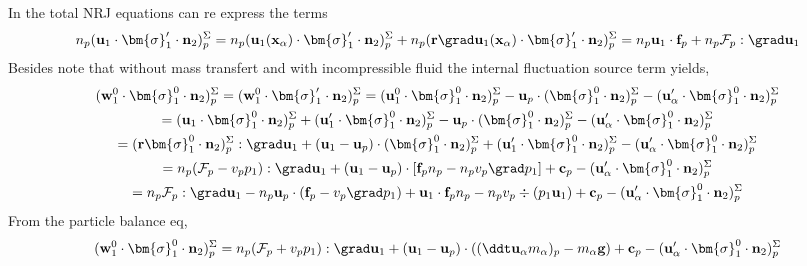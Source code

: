 In the total NRJ equations can re express the terms 
\begin{multline*}
    n_p (\textbf{u}_1 \cdot \bm{\sigma}_1' \cdot  \textbf{n}_2)^\Sigma_p
    = 
    n_p (\textbf{u}_1(\textbf{x}_\alpha) \cdot \bm{\sigma}_1' \cdot  \textbf{n}_2)^\Sigma_p
    + n_p (\textbf{r}\grad\textbf{u}_1(\textbf{x}_\alpha) \cdot \bm{\sigma}_1' \cdot  \textbf{n}_2)^\Sigma_p
    =n_p \textbf{u}_1 \cdot \textbf{f}_p
    + n_p \mathcal{F}_p :\grad \textbf{u}_1
\end{multline*}
Besides note that without mass transfert and with incompressible fluid the internal fluctuation source term yields,
\begin{multline*}
    (\textbf{w}_1^0 \cdot \bm{\sigma}_1^0 \cdot  \textbf{n}_2)^\Sigma_p
    =   
    (\textbf{w}_1^0 \cdot \bm{\sigma}_1' \cdot  \textbf{n}_2)^\Sigma_p
    =   
    (\textbf{u}_1^0 \cdot \bm{\sigma}_1^0 \cdot  \textbf{n}_2)^\Sigma_p
    - \textbf{u}_p \cdot (\bm{\sigma}_1^0 \cdot  \textbf{n}_2)^\Sigma_p
    - (\textbf{u}_\alpha' \cdot \bm{\sigma}_1^0 \cdot  \textbf{n}_2)^\Sigma_p\\
    =   
    (\textbf{u}_1 \cdot \bm{\sigma}_1^0 \cdot  \textbf{n}_2)^\Sigma_p
    + (\textbf{u}_1' \cdot \bm{\sigma}_1^0 \cdot  \textbf{n}_2)^\Sigma_p
    - \textbf{u}_p \cdot (\bm{\sigma}_1^0 \cdot  \textbf{n}_2)^\Sigma_p
    - (\textbf{u}_\alpha' \cdot \bm{\sigma}_1^0 \cdot  \textbf{n}_2)^\Sigma_p\\
    =   
    (\textbf{r}\bm{\sigma}_1^0 \cdot  \textbf{n}_2)^\Sigma_p : \grad \textbf{u}_1+
    (\textbf{u}_1 - \textbf{u}_p) \cdot (\bm{\sigma}_1^0 \cdot  \textbf{n}_2)^\Sigma_p
    + (\textbf{u}_1' \cdot \bm{\sigma}_1^0 \cdot  \textbf{n}_2)^\Sigma_p
    - (\textbf{u}_\alpha' \cdot \bm{\sigma}_1^0 \cdot  \textbf{n}_2)^\Sigma_p\\
    =   
    n_p(\mathcal{F}_p - v_p p_1): \grad \textbf{u}_1+
    (\textbf{u}_1 - \textbf{u}_p) \cdot [\textbf{f}_pn_p - n_pv_p\grad p_1]
    + \textbf{c}_p
    - (\textbf{u}_\alpha' \cdot \bm{\sigma}_1^0 \cdot  \textbf{n}_2)^\Sigma_p\\
    =   
    n_p \mathcal{F}_p : \grad \textbf{u}_1
    - n_p \textbf{u}_p \cdot (\textbf{f}_p - v_p\grad p_1)
    + \textbf{u}_1  \cdot \textbf{f}_pn_p 
    - n_pv_p \div (p_1 \textbf{u}_1)
    + \textbf{c}_p
    - (\textbf{u}_\alpha' \cdot \bm{\sigma}_1^0 \cdot  \textbf{n}_2)^\Sigma_p\\
\end{multline*}
From the particle balance eq, 
\begin{equation}
    (\textbf{w}_1^0 \cdot \bm{\sigma}_1^0 \cdot  \textbf{n}_2)^\Sigma_p
    =
    n_p(\mathcal{F}_p + v_p p_1): \grad \textbf{u}_1+
    (\textbf{u}_1 - \textbf{u}_p) \cdot ((\ddt \textbf{u}_\alpha m_\alpha)_p - m_\alpha \textbf{g})
    + \textbf{c}_p
    - (\textbf{u}_\alpha' \cdot \bm{\sigma}_1^0 \cdot  \textbf{n}_2)^\Sigma_p\\
\end{equation}

